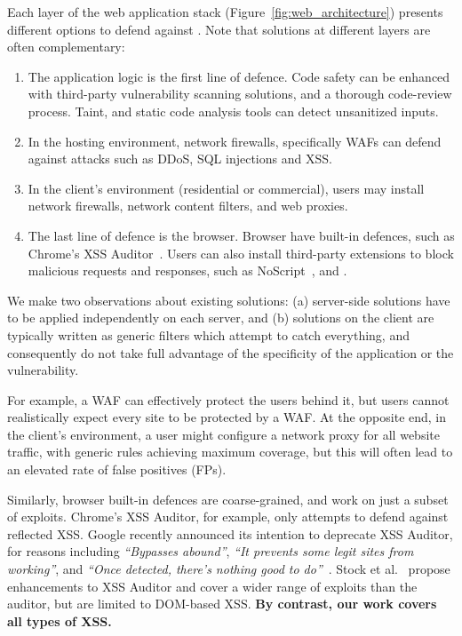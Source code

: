 Each layer of the web application stack (Figure~\ref{fig:web_architecture}) presents different options to defend against \xss. Note that solutions at different layers are often complementary:
\begin{enumerate}

\item The application logic is the first line of defence.
  Code safety can be enhanced with third-party vulnerability scanning solutions, and a thorough
  code-review process. Taint, and static code analysis tools can detect unsanitized inputs.

\item In the hosting environment, network firewalls, specifically \acp{WAF} can defend against attacks such as \ac{DDoS}, \ac{SQL} injections and \ac{XSS}.

\item In the client's environment (residential or commercial), users may install network firewalls, network content filters, and web proxies.

\item The last line of defence is the browser.
  Browser have built-in defences, such as
  Chrome's \ac{XSS} Auditor~\cite{xssauditor}. Users can also
  install third-party extensions to block malicious requests and
  responses, such as NoScript~\cite{Noscript}, and \sys.
\end{enumerate}

We make two observations about existing solutions: (a) server-side
solutions have to be applied independently on each server, and (b)
solutions on the client are typically written as generic filters which
attempt to catch everything, and consequently do not take full advantage
of the specificity of the application or the vulnerability.

For example, a \ac{WAF} can effectively protect the users
behind it, but users cannot realistically expect every site to
be protected by a \ac{WAF}. At the opposite end, in the client's
environment, a user might configure a network proxy for all website
traffic, with generic rules achieving maximum coverage, but this
will often lead to an elevated rate of false positives (FPs).

Similarly, browser built-in defences are coarse-grained, and 
work on just a subset of exploits. Chrome's XSS Auditor, for example, only
attempts to defend against reflected \ac{XSS}. Google recently
announced its intention to deprecate XSS Auditor, for reasons
including \emph{``Bypasses abound''}, \emph{``It prevents some legit
  sites from working''}, and \emph{``Once detected, there's nothing
  good to do''}~\cite{deprecatexssauditor}. Stock et
al.~\cite{precise_dom_xss} propose enhancements to XSS Auditor and
cover a wider range of exploits than the auditor, but are limited to
DOM-based \ac{XSS}.  \textbf{By contrast, our work covers all types of \ac{XSS}.}

